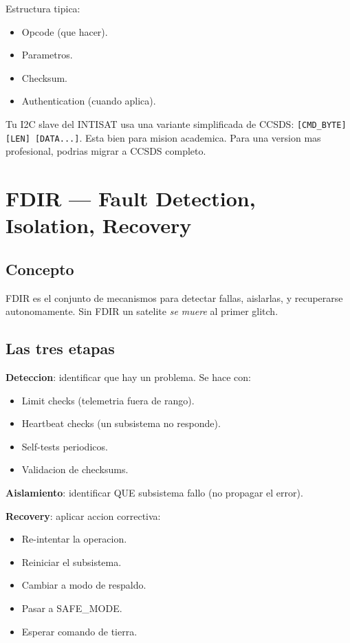 \documentclass[11pt,a4paper,oneside,openright]{book}
\begin{document}
Estructura tipica:
\begin{itemize}[leftmargin=2em]
  \item Opcode (que hacer).
  \item Parametros.
  \item Checksum.
  \item Authentication (cuando aplica).
\end{itemize}

\begin{payload}
Tu I2C slave del INTISAT usa una variante simplificada de CCSDS:
\texttt{[CMD\_BYTE] [LEN] [DATA...]}. Esta bien para mision academica.
Para una version mas profesional, podrias migrar a CCSDS completo.
\end{payload}

\chapter{FDIR --- Fault Detection, Isolation, Recovery}

\section{Concepto}

FDIR es el conjunto de mecanismos para detectar fallas, aislarlas, y
recuperarse autonomamente. Sin FDIR un satelite \emph{se muere} al primer
glitch.

\section{Las tres etapas}

\textbf{Deteccion}: identificar que hay un problema. Se hace con:
\begin{itemize}[leftmargin=2em]
  \item Limit checks (telemetria fuera de rango).
  \item Heartbeat checks (un subsistema no responde).
  \item Self-tests periodicos.
  \item Validacion de checksums.
\end{itemize}

\textbf{Aislamiento}: identificar QUE subsistema fallo (no propagar el
error).

\textbf{Recovery}: aplicar accion correctiva:
\begin{itemize}[leftmargin=2em]
  \item Re-intentar la operacion.
  \item Reiniciar el subsistema.
  \item Cambiar a modo de respaldo.
  \item Pasar a SAFE\_MODE.
  \item Esperar comando de tierra.
\end{itemize}
\end{document}
